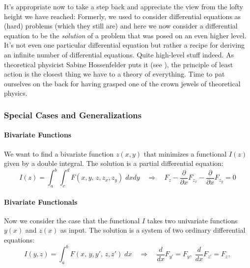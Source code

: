 \medskip
It's appropriate now to take a step back and appreciate the view from the lofty height we have reached:  Formerly, we used to consider differential equations as (hard) problems (which they still are) and here we now consider a differential equation to be the \emph{solution} of a problem that was posed on an even higher level. It's not even one particular differential equation but rather a recipe for deriving an infinite number of differential equations. Quite high-level stuff indeed. As theoretical physicist Sabine Hossenfelder puts it (see \cite{YT_LeastAction}), the principle of least action is the closest thing we have to a theory of everything. Time to pat ourselves on the back for having grasped one of the crown jewels of theoretical physics. 


\subsubsection{Special Cases and Generalizations}


\paragraph{Bivariate Functions} We want to find a bivariate function $z(x,y)$ that minimizes a functional $I(z)$ given by a double integral. The solution is a partial differential equation:
\begin{equation}
 I(z) = \int_a^b \int_c^d  F(x,y, \, z,z_x,z_y ) \; dx dy
 \quad \Rightarrow \quad
  F_z - \frac{\partial}{\partial x} F_{z_x} - \frac{\partial}{\partial x} F_{z_y} = 0
\end{equation}

\paragraph{Bivariate Functionals} Now we consider the case that the functional $I$ takes two univariate functions $y(x)$ and $z(x)$ as input. The solution is a system of two ordinary differential equations:
\begin{equation}
 I(y,z) = \int_a^b F(x, \, y,y', \, z,z') \; dx
 \quad \Rightarrow \quad
 \frac{d}{d x} F_{y'} = F_y, \;  \frac{d}{d x} F_{z'} = F_z,
\end{equation}

